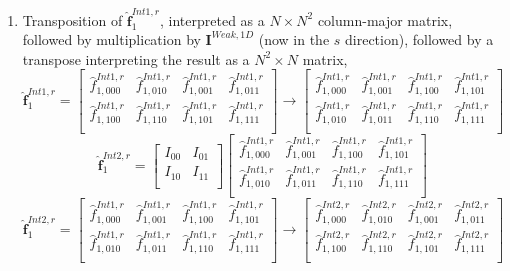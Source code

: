 \documentclass[12pt,Bold,letterpaper,TexShade]{mcgilletdclass}
\numberwithin{equation}{section}
\begin{document}
\begin{enumerate}
\item Transposition of $\hat{\boldsymbol f}^{Int1,r}_{1}$, interpreted as a $N \times N^2$ column-major matrix, followed by multiplication by $\boldsymbol I^{Weak,1D}$ (now in the $s$ direction), followed by a transpose interpreting the result as a $N^2 \times N$ matrix,
\begin{equation} \nonumber
\hat{\boldsymbol f}^{Int1,r}_{1}
=
\begin{bmatrix}
\hat{f}^{Int1,r}_{1,000} & \hat{f}^{Int1,r}_{1,010} & \hat{f}^{Int1,r}_{1,001} & \hat{f}^{Int1,r}_{1,011} \\
\hat{f}^{Int1,r}_{1,100} & \hat{f}^{Int1,r}_{1,110} & \hat{f}^{Int1,r}_{1,101} & \hat{f}^{Int1,r}_{1,111} \\
\end{bmatrix}
\rightarrow
\begin{bmatrix}
\hat{f}^{Int1,r}_{1,000} & \hat{f}^{Int1,r}_{1,001} & \hat{f}^{Int1,r}_{1,100} & \hat{f}^{Int1,r}_{1,101} \\
\hat{f}^{Int1,r}_{1,010} & \hat{f}^{Int1,r}_{1,011} & \hat{f}^{Int1,r}_{1,110} & \hat{f}^{Int1,r}_{1,111} \\
\end{bmatrix}
\end{equation}
\begin{equation} \nonumber
\hat{\boldsymbol f}^{Int2,r}_{1}
=
\begin{bmatrix}
I_{00} & I_{01} \\
I_{10} & I_{11} \\
\end{bmatrix}
\begin{bmatrix}
\hat{f}^{Int1,r}_{1,000} & \hat{f}^{Int1,r}_{1,001} & \hat{f}^{Int1,r}_{1,100} & \hat{f}^{Int1,r}_{1,101} \\
\hat{f}^{Int1,r}_{1,010} & \hat{f}^{Int1,r}_{1,011} & \hat{f}^{Int1,r}_{1,110} & \hat{f}^{Int1,r}_{1,111} \\
\end{bmatrix}
\end{equation}
\begin{equation} \nonumber
\hat{\boldsymbol f}^{Int2,r}_{1}
=
\begin{bmatrix}
\hat{f}^{Int1,r}_{1,000} & \hat{f}^{Int1,r}_{1,001} & \hat{f}^{Int1,r}_{1,100} & \hat{f}^{Int1,r}_{1,101} \\
\hat{f}^{Int1,r}_{1,010} & \hat{f}^{Int1,r}_{1,011} & \hat{f}^{Int1,r}_{1,110} & \hat{f}^{Int1,r}_{1,111} \\
\end{bmatrix}
\rightarrow
\begin{bmatrix}
\hat{f}^{Int2,r}_{1,000} & \hat{f}^{Int2,r}_{1,010} & \hat{f}^{Int2,r}_{1,001} & \hat{f}^{Int2,r}_{1,011} \\
\hat{f}^{Int2,r}_{1,100} & \hat{f}^{Int2,r}_{1,110} & \hat{f}^{Int2,r}_{1,101} & \hat{f}^{Int2,r}_{1,111} \\
\end{bmatrix}
\end{equation}


\end{enumerate}
\end{document}
